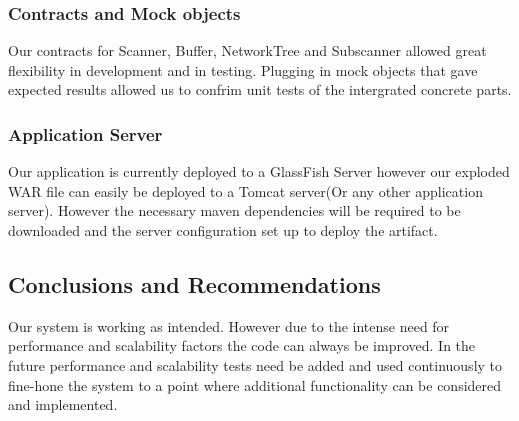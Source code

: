 \documentclass[hidelinks,a4paper,12pt]{article}
\begin{document}
\subsubsection{Contracts and Mock objects}
Our contracts for  Scanner, Buffer, NetworkTree and Subscanner allowed great flexibility  in development and in testing. Plugging in mock objects that gave expected results allowed us to confrim unit tests of the intergrated concrete parts.
\subsubsection{Application Server}
Our application is currently deployed to a GlassFish Server however our exploded WAR file can easily be deployed to a Tomcat server(Or any other application server). However the necessary maven dependencies will be required to be downloaded and the server configuration set up to deploy the artifact.

\subsection{Conclusions and Recommendations}
Our system is working as intended. However due to the intense need for performance and scalability factors the code can always be improved. In the future performance and scalability tests need be added and used continuously to fine-hone the system to a point where additional functionality can be considered and implemented. 
\end{document}
